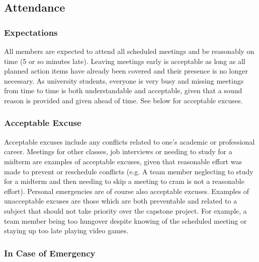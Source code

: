 \documentclass{article}
\begin{document}
\subsection*{Attendance}

\subsubsection*{Expectations}


\par{All members are expected to attend all scheduled meetings and be reasonably on time (5 or so minutes late). Leaving meetings early is acceptable as long
as all planned action items have already been covered and their presence is no longer necessary. As university students, everyone is very busy and missing
meetings from time to time is both understandable and acceptable, given that a sound reason is provided and given ahead of time. See below for acceptable excuses.}

\subsubsection*{Acceptable Excuse}


\par{Acceptable excuses include any conflicts related to one's academic or professional career. Meetings for other classes, job interviews or
needing to study for a midterm are examples of acceptable excuses, given that reasonable effort was made to prevent or reschedule conflicts (e.g. A team member
neglecting to study for a midterm and then needing to skip a meeting to cram is not a reasonable effort). Personal emergencies are of course also acceptable
excuses. Examples of unacceptable excuses are those which are both preventable and related to a subject that should not take priority over the capstone project.
For example, a team member being too hungover despite knowing of the scheduled meeting or staying up too late playing video games.}

\subsubsection*{In Case of Emergency}
\end{document}
